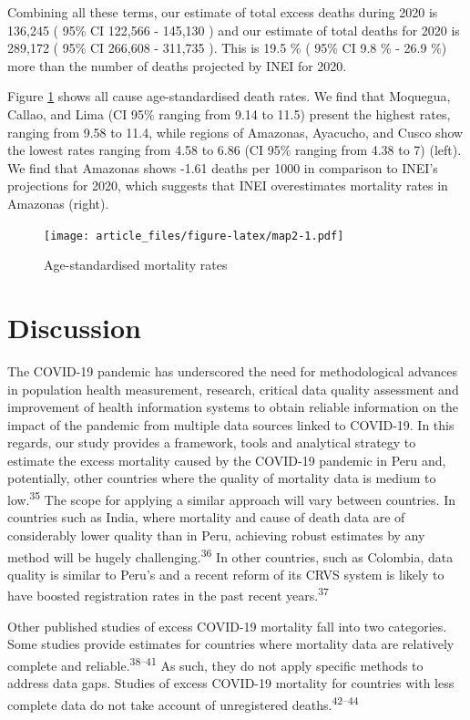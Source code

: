 \documentclass[
]{article}
\begin{document}
Combining all these terms, our estimate of total excess deaths during 2020 is 136,245 ( 95\% CI 122,566 - 145,130 ) and our estimate of total deaths for 2020 is 289,172 ( 95\% CI 266,608 - 311,735 ). This is 19.5 \% ( 95\% CI 9.8 \% - 26.9 \%) more than the number of deaths projected by INEI for 2020.

Figure \ref{fig:map2} shows all cause age-standardised death rates. We find that Moquegua, Callao, and Lima (CI 95\% ranging from 9.14 to 11.5) present the highest rates, ranging from 9.58 to 11.4, while regions of Amazonas, Ayacucho, and Cusco show the lowest rates ranging from 4.58 to 6.86 (CI 95\% ranging from 4.38 to 7) (left). We find that Amazonas shows -1.61 deaths per 1000 in comparison to INEI's projections for 2020, which suggests that INEI overestimates mortality rates in Amazonas (right).

\begin{figure}
\centering
\texttt{[image: article\_files/figure-latex/map2-1.pdf]}
\caption{\label{fig:map2}Age-standardised mortality rates}
\end{figure}

\hypertarget{discussion}{%
\section{Discussion}\label{discussion}}

The COVID-19 pandemic has underscored the need for methodological advances in population health measurement, research, critical data quality assessment and improvement of health information systems to obtain reliable information on the impact of the pandemic from multiple data sources linked to COVID-19. In this regards, our study provides a framework, tools and analytical strategy to estimate the excess mortality caused by the COVID-19 pandemic in Peru and, potentially, other countries where the quality of mortality data is medium to low.\textsuperscript{35} The scope for applying a similar approach will vary between countries. In countries such as India, where mortality and cause of death data are of considerably lower quality than in Peru, achieving robust estimates by any method will be hugely challenging.\textsuperscript{36} In other countries, such as Colombia, data quality is similar to Peru's and a recent reform of its CRVS system is likely to have boosted registration rates in the past recent years.\textsuperscript{37}

Other published studies of excess COVID-19 mortality fall into two categories. Some studies provide estimates for countries where mortality data are relatively complete and reliable.\textsuperscript{38--41} As such, they do not apply specific methods to address data gaps. Studies of excess COVID-19 mortality for countries with less complete data do not take account of unregistered deaths.\textsuperscript{42--44}
\end{document}
